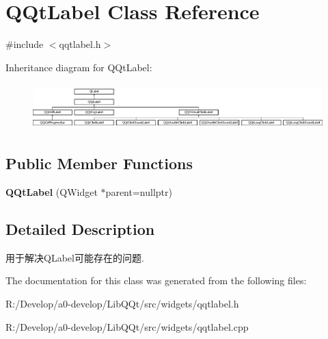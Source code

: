 \hypertarget{class_q_qt_label}{}\section{Q\+Qt\+Label Class Reference}
\label{class_q_qt_label}


{\ttfamily \#include $<$qqtlabel.\+h$>$}

Inheritance diagram for Q\+Qt\+Label\+:\begin{figure}[H]
\begin{center}
\leavevmode
\includegraphics[height=1.797753cm]{class_q_qt_label}
\end{center}
\end{figure}
\subsection*{Public Member Functions}
\begin{DoxyCompactItemize}
\item 
\mbox{\label{class_q_qt_label_ae4290b4fdfba5f762b97625a56deb0a6}} 
{\bfseries Q\+Qt\+Label} (Q\+Widget $\ast$parent=nullptr)
\end{DoxyCompactItemize}


\subsection{Detailed Description}
用于解决\+Q\+Label可能存在的问题. 

The documentation for this class was generated from the following files\+:\begin{DoxyCompactItemize}
\item 
R\+:/\+Develop/a0-\/develop/\+Lib\+Q\+Qt/src/widgets/qqtlabel.\+h\item 
R\+:/\+Develop/a0-\/develop/\+Lib\+Q\+Qt/src/widgets/qqtlabel.\+cpp\end{DoxyCompactItemize}
